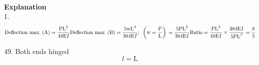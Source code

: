 \documentclass[11pt,a4paper]{article}
\begin{document}
\\\textbf{Explanation}\\
1.
$$
{\text{Deflection max }}\left( {\text{A}} \right) = \frac{{{\text{P}}{{\text{L}}^3}}}{{48{\text{E}}I}} \\\\
{\text{Deflection max }}\left( {\text{B}} \right) = \frac{{5{\text{w}}{{\text{L}}^4}}}{{384{\text{E}}I}};\,\,\,\left( {{\text{w}} = \frac{{\text{P}}}{{\text{L}}}} \right) \\\\
 = \frac{{5{\text{P}}{{\text{L}}^3}}}{{384{\text{E}}I}} \\\\
{\text{Ratio}} = \frac{{{\text{P}}{{\text{L}}^3}}}{{48{\text{E}}I}} \times \frac{{384{\text{E}}I}}{{5{\text{P}}{{\text{L}}^3}}} = \frac{8}{5} $$

49.
Both ends hinged $$l = {\text{L}}$$
\clearpage
\end{document}
